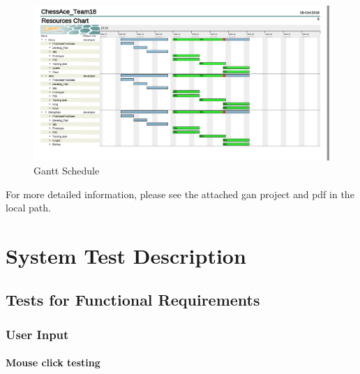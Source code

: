 \documentclass[12pt, titlepage]{article}
\begin{document}
\begin{figure}[H]
  \includegraphics[width=\linewidth]{schedule.png}
  \caption{Gantt Schedule}
  \label{fig:schl}
\end{figure}

For more detailed information, please see the attached gan project and pdf in the local path.
\section{System Test Description}
	
\subsection{Tests for Functional Requirements}

\subsubsection{User Input}
		
\paragraph{Mouse click testing}
\end{document}
